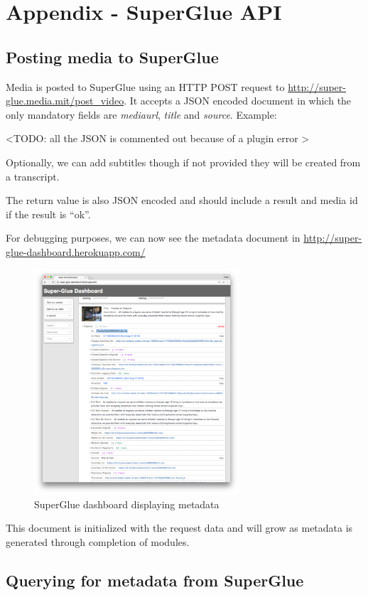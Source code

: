 \chapter{Appendix - SuperGlue API}
\label{appendix}

\section{Posting media to SuperGlue}
Media is posted to SuperGlue using an HTTP POST request to \url{http://super-glue.media.mit/post_video}. It accepts a JSON\cite{json} encoded document in which the only mandatory fields are \textit{mediaurl}, \textit{title} and \textit{source}. Example: 

<TODO: all the JSON is commented out because of a plugin error >


Optionally, we can add subtitles though if not provided they will be created from a transcript. 

The return value is also JSON encoded and should include a result and media id if the result is ``ok''.


For debugging purposes, we can now see the metadata document in \url{http://super-glue-dashboard.herokuapp.com/} 

\begin{figure}[thpb]
  \centering
  \includegraphics[width=3in]{figures/super-glue-dashboard.png}
  \caption{SuperGlue dashboard displaying metadata}
  \label{fig_superglue_dashboard}
\end{figure}

This document is initialized with the request data and will grow as metadata is generated through completion of modules. 

\section{Querying for metadata from SuperGlue}
